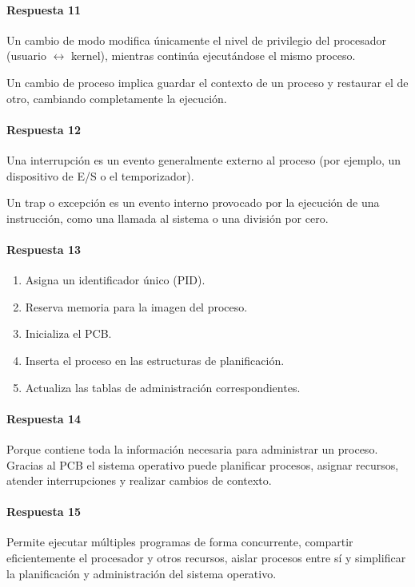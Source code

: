 \paragraph{Respuesta 11}
Un cambio de modo modifica únicamente el nivel de privilegio del procesador (usuario \(\leftrightarrow\) kernel), mientras continúa ejecutándose el mismo proceso.

Un cambio de proceso implica guardar el contexto de un proceso y restaurar el de otro, cambiando completamente la ejecución.

\paragraph{Respuesta 12}
Una interrupción es un evento generalmente externo al proceso (por ejemplo, un dispositivo de E/S o el temporizador).

Un trap o excepción es un evento interno provocado por la ejecución de una instrucción, como una llamada al sistema o una división por cero.

\paragraph{Respuesta 13}
\begin{enumerate}
  \item Asigna un identificador único (PID).
  \item Reserva memoria para la imagen del proceso.
  \item Inicializa el PCB.
  \item Inserta el proceso en las estructuras de planificación.
  \item Actualiza las tablas de administración correspondientes.
\end{enumerate}

\paragraph{Respuesta 14}
Porque contiene toda la información necesaria para administrar un proceso. Gracias al PCB el sistema operativo puede planificar procesos, asignar recursos, atender interrupciones y realizar cambios de contexto.

\paragraph{Respuesta 15}
Permite ejecutar múltiples programas de forma concurrente, compartir eficientemente el procesador y otros recursos, aislar procesos entre sí y simplificar la planificación y administración del sistema operativo.

